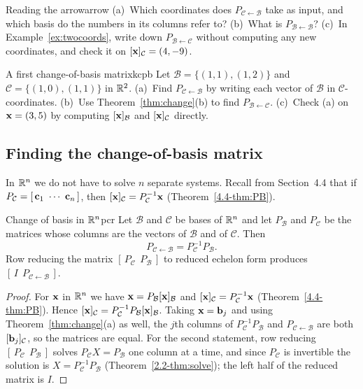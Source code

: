 \documentclass[11pt]{article}
\begin{document}
\begin{think}{Reading the arrow}{arrow}
(a)~Which coordinates does $P_{\mathcal{C}\leftarrow\mathcal{B}}$ take as input, and which basis do the numbers in its columns refer to? (b)~What is $P_{\mathcal{B}\leftarrow\mathcal{B}}$? (c)~In Example~\ref{ex:twocoords}, write down $P_{\mathcal{B}\leftarrow\mathcal{C}}$ without computing any new coordinates, and check it on $[\mathbf{x}]_{\mathcal{C}}=(4,-9)$.
\end{think}

\begin{kc}{A first change-of-basis matrix}{kcpb}
Let $\mathcal{B}=\{(1,1),(1,2)\}$ and $\mathcal{C}=\{(1,0),(1,1)\}$ in $\mathbb{R}^2$. (a)~Find $P_{\mathcal{C}\leftarrow\mathcal{B}}$ by writing each vector of $\mathcal{B}$ in $\mathcal{C}$-coordinates. (b)~Use Theorem~\ref{thm:change}(b) to find $P_{\mathcal{B}\leftarrow\mathcal{C}}$. (c)~Check (a) on $\mathbf{x}=(3,5)$ by computing $[\mathbf{x}]_{\mathcal{B}}$ and $[\mathbf{x}]_{\mathcal{C}}$ directly.
\end{kc}

\subsection*{Finding the change-of-basis matrix}

In $\mathbb{R}^n$ we do not have to solve $n$ separate systems. Recall from Section~4.4 that if $P_{\mathcal{C}}=[\,\bv{c}_1\ \cdots\ \bv{c}_n\,]$, then $[\mathbf{x}]_{\mathcal{C}}=P_{\mathcal{C}}^{-1}\mathbf{x}$ (Theorem~\ref{4.4-thm:PB}).

\begin{thm}{Change of basis in $\mathbb{R}^n$}{pcr}
Let $\mathcal{B}$ and $\mathcal{C}$ be bases of $\mathbb{R}^n$ and let $P_{\mathcal{B}}$ and $P_{\mathcal{C}}$ be the matrices whose columns are the vectors of $\mathcal{B}$ and of $\mathcal{C}$. Then
\[
P_{\mathcal{C}\leftarrow\mathcal{B}}=P_{\mathcal{C}}^{-1}P_{\mathcal{B}}.
\]
Row reducing the matrix $[\,P_{\mathcal{C}}\ \ P_{\mathcal{B}}\,]$ to reduced echelon form produces $[\,I\ \ P_{\mathcal{C}\leftarrow\mathcal{B}}\,]$.
\end{thm}

\begin{proof}
For $\mathbf{x}$ in $\mathbb{R}^n$ we have $\mathbf{x}=P_{\mathcal{B}}[\mathbf{x}]_{\mathcal{B}}$ and $[\mathbf{x}]_{\mathcal{C}}=P_{\mathcal{C}}^{-1}\mathbf{x}$ (Theorem~\ref{4.4-thm:PB}). Hence $[\mathbf{x}]_{\mathcal{C}}=P_{\mathcal{C}}^{-1}P_{\mathcal{B}}[\mathbf{x}]_{\mathcal{B}}$. Taking $\mathbf{x}=\mathbf{b}_j$ and using Theorem~\ref{thm:change}(a) as well, the $j$th columns of $P_{\mathcal{C}}^{-1}P_{\mathcal{B}}$ and $P_{\mathcal{C}\leftarrow\mathcal{B}}$ are both $[\mathbf{b}_j]_{\mathcal{C}}$, so the matrices are equal. For the second statement, row reducing $[\,P_{\mathcal{C}}\ \ P_{\mathcal{B}}\,]$ solves $P_{\mathcal{C}}X=P_{\mathcal{B}}$ one column at a time, and since $P_{\mathcal{C}}$ is invertible the solution is $X=P_{\mathcal{C}}^{-1}P_{\mathcal{B}}$ (Theorem~\ref{2.2-thm:solve}); the left half of the reduced matrix is $I$.
\end{proof}
\end{document}
